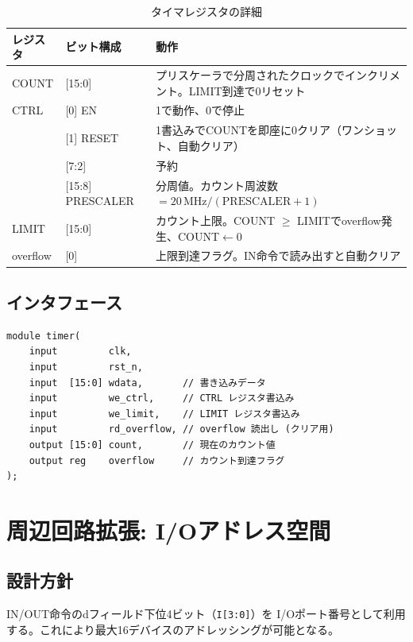 \documentclass[a4paper,11pt]{ltjsarticle}
\begin{document}
\begin{table}[h]
\centering
\caption{タイマレジスタの詳細}
\begin{tabular}{lp{3cm}p{7cm}}
\toprule
レジスタ & ビット構成 & 動作 \\
\midrule
COUNT & [15:0] & プリスケーラで分周されたクロックでインクリメント。LIMIT到達で0リセット \\
CTRL  & [0] EN & 1で動作、0で停止 \\
      & [1] RESET & 1書込みでCOUNTを即座に0クリア（ワンショット、自動クリア） \\
      & [7:2] & 予約 \\
      & [15:8] PRESCALER & 分周値。カウント周波数 $= 20\,\mathrm{MHz} / (\mathrm{PRESCALER} + 1)$ \\
LIMIT & [15:0] & カウント上限。COUNT $\geq$ LIMITでoverflow発生、COUNT$\leftarrow$0 \\
overflow & [0] & 上限到達フラグ。IN命令で読み出すと自動クリア \\
\bottomrule
\end{tabular}
\end{table}

\subsection{インタフェース}

\begin{lstlisting}[caption={タイマモジュールのインタフェース}]
module timer(
    input         clk,
    input         rst_n,
    input  [15:0] wdata,       // 書き込みデータ
    input         we_ctrl,     // CTRL レジスタ書込み
    input         we_limit,    // LIMIT レジスタ書込み
    input         rd_overflow, // overflow 読出し (クリア用)
    output [15:0] count,       // 現在のカウント値
    output reg    overflow     // カウント到達フラグ
);
\end{lstlisting}


\section{周辺回路拡張: I/Oアドレス空間}

\subsection{設計方針}

IN/OUT命令のdフィールド下位4ビット（\texttt{I[3:0]}）を
I/Oポート番号として利用する。これにより最大16デバイスのアドレッシングが可能となる。
\end{document}
